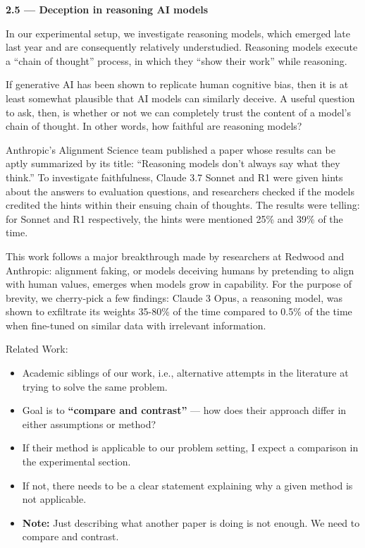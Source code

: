 \documentclass{article}
\begin{document}
\textbf{2.5 --- Deception in reasoning AI models}

In our experimental setup, we investigate reasoning models, which emerged late last year and are consequently relatively understudied. Reasoning models execute a “chain of thought” process, in which they “show their work” while reasoning.

If generative AI has been shown to replicate human cognitive bias, then it is at least somewhat plausible that AI models can similarly deceive. A useful question to ask, then, is whether or not we can completely trust the content of a model’s chain of thought. In other words, how faithful are reasoning models?

Anthropic’s Alignment Science team published a paper whose results can be aptly summarized by its title: “Reasoning models don’t always say what they think.” To investigate faithfulness, Claude 3.7 Sonnet and R1 were given hints about the answers to evaluation questions, and researchers checked if the models credited the hints within their ensuing chain of thoughts. The results were telling: for Sonnet and R1 respectively, the hints were mentioned 25\% and 39\% of the time. \citep{chen_reasoning_2025}

This work follows a major breakthrough made by researchers at Redwood and Anthropic: alignment faking, or models deceiving humans by pretending to align with human values, emerges when models grow in capability. For the purpose of brevity, we cherry-pick a few findings: Claude 3 Opus, a reasoning model, was shown to exfiltrate its weights 35-80\% of the time compared to 0.5\% of the time when fine-tuned on similar data with irrelevant information. \citep{greenblatt_alignment_2024}


Related Work:

\begin{itemize}
    \item Academic siblings of our work, i.e., alternative attempts in the literature at trying to solve the same problem.
    \item Goal is to \textbf{“compare and contrast”} — how does their approach differ in either assumptions or method?
    \item If their method is applicable to our problem setting, I expect a comparison in the experimental section.
    \item If not, there needs to be a clear statement explaining why a given method is not applicable.
    \item \textbf{Note:} Just describing what another paper is doing is not enough. We need to compare and contrast.
\end{itemize}
\end{document}

